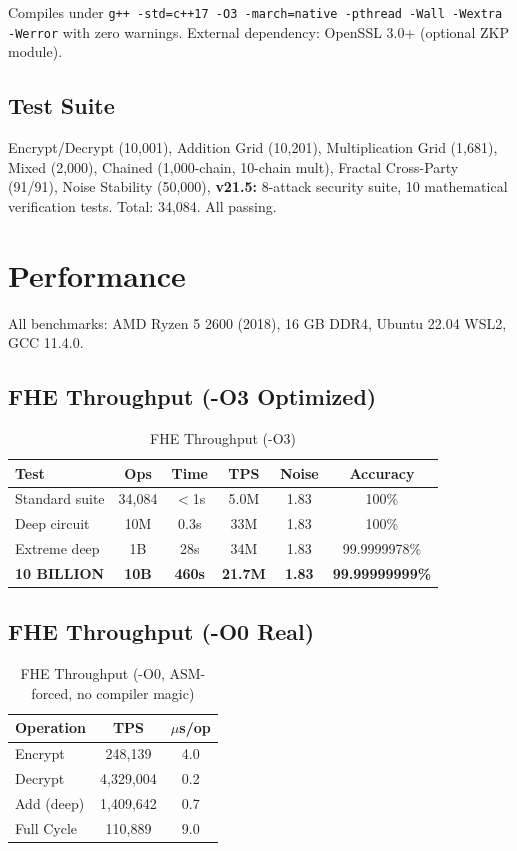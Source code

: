 \documentclass[11pt,a4paper]{article}
\begin{document}
Compiles under \texttt{g++ -std=c++17 -O3 -march=native -pthread -Wall -Wextra -Werror} with zero warnings. External dependency: OpenSSL 3.0+ (optional ZKP module).

\subsection{Test Suite}
Encrypt/Decrypt (10,001), Addition Grid (10,201), Multiplication Grid (1,681), Mixed (2,000), Chained (1,000-chain, 10-chain mult), Fractal Cross-Party (91/91), Noise Stability (50,000), \textbf{v21.5:} 8-attack security suite, 10 mathematical verification tests. Total: 34,084. All passing.

\section{Performance}

All benchmarks: AMD Ryzen 5 2600 (2018), 16 GB DDR4, Ubuntu 22.04 WSL2, GCC 11.4.0.

\subsection{FHE Throughput (-O3 Optimized)}

\begin{table}[h]
\centering
\begin{tabular}{|l|c|c|c|c|c|}
\hline
\textbf{Test} & \textbf{Ops} & \textbf{Time} & \textbf{TPS} & \textbf{Noise} & \textbf{Accuracy} \\
\hline
Standard suite & 34,084 & $<$1s & 5.0M & 1.83 & 100\% \\
Deep circuit & 10M & 0.3s & 33M & 1.83 & 100\% \\
Extreme deep & 1B & 28s & 34M & 1.83 & 99.9999978\% \\
\textbf{10 BILLION} & \textbf{10B} & \textbf{460s} & \textbf{21.7M} & \textbf{1.83} & \textbf{99.99999999\%} \\
\hline
\end{tabular}
\caption{FHE Throughput (-O3)}
\end{table}

\subsection{FHE Throughput (-O0 Real)}

\begin{table}[h]
\centering
\begin{tabular}{|l|c|c|}
\hline
\textbf{Operation} & \textbf{TPS} & \textbf{$\mu$s/op} \\
\hline
Encrypt & 248,139 & 4.0 \\
Decrypt & 4,329,004 & 0.2 \\
Add (deep) & 1,409,642 & 0.7 \\
Full Cycle & 110,889 & 9.0 \\
\hline
\end{tabular}
\caption{FHE Throughput (-O0, ASM-forced, no compiler magic)}
\end{table}
\end{document}
